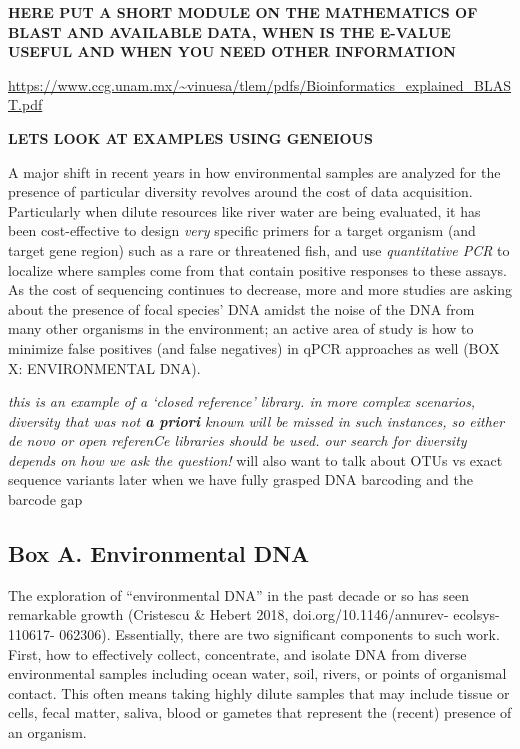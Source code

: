 \documentclass[
]{article}
\begin{document}
\textbf{HERE PUT A SHORT MODULE ON THE MATHEMATICS OF BLAST AND
AVAILABLE DATA, WHEN IS THE E-VALUE USEFUL AND WHEN YOU NEED OTHER
INFORMATION}

\url{https://www.ccg.unam.mx/~vinuesa/tlem/pdfs/Bioinformatics_explained_BLAST.pdf}

\textbf{LETS LOOK AT EXAMPLES USING GENEIOUS}

A major shift in recent years in how environmental samples are analyzed
for the presence of particular diversity revolves around the cost of
data acquisition. Particularly when dilute resources like river water
are being evaluated, it has been cost-effective to design \emph{very}
specific primers for a target organism (and target gene region) such as
a rare or threatened fish, and use \emph{quantitative PCR} to localize
where samples come from that contain positive responses to these assays.
As the cost of sequencing continues to decrease, more and more studies
are asking about the presence of focal species' DNA amidst the noise of
the DNA from many other organisms in the environment; an active area of
study is how to minimize false positives (and false negatives) in qPCR
approaches as well (BOX X: ENVIRONMENTAL DNA).

\emph{this is an example of a `closed reference' library. in more
complex scenarios, diversity that was not \textbf{ a priori } known will
be missed in such instances, so either de novo or open referenCe
libraries should be used. our search for diversity depends on how we ask
the question!} will also want to talk about OTUs vs exact sequence
variants later when we have fully grasped DNA barcoding and the barcode
gap

\hypertarget{BoxX}{%
\subsection{Box A. Environmental DNA}\label{BoxX}}

The exploration of ``environmental DNA'' in the past decade or so has
seen remarkable growth (Cristescu \& Hebert 2018,
doi.org/10.1146/annurev- ecolsys- 110617- 062306). Essentially, there
are two significant components to such work. First, how to effectively
collect, concentrate, and isolate DNA from diverse environmental samples
including ocean water, soil, rivers, or points of organismal contact.
This often means taking highly dilute samples that may include tissue or
cells, fecal matter, saliva, blood or gametes that represent the
(recent) presence of an organism.
\end{document}
